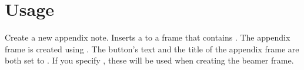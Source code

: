 \documentclass{l3doc}
\begin{document}


\section{Usage}

\begin{function}{\appxnote}
  \begin{syntax}
  \end{syntax}
  
  Create a new appendix note.  Inserts a  to a frame that contains .  The appendix frame is created using .  The button’s text and the title of the appendix frame are both set to .  If you specify , these will be used when creating the beamer frame.
  \end{function}
\end{document}
